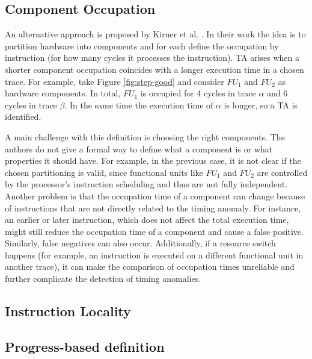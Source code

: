 \subsection{Component Occupation}

An alternative approach is proposed by Kirner et al. \cite{kirner_precise_2009}. In their work the idea is to partition hardware into components and for each define the occupation by instruction (for how many cycles it processes the instruction). TA arises when a shorter component occupation coincides with a longer execution time in a chosen trace. For example, take Figure \ref{fig:step-good} and consider $FU_1$ and $FU_2$ as hardware components. In total, $FU_1$ is occupied for 4 cycles in trace $\alpha$ and 6 cycles in trace $\beta$. In the same time the execution time of $\alpha$ is longer, so a TA is identified.

A main challenge with this definition is choosing the right components. The authors do not give a formal way to define what a component is or what properties it should have. For example, in the previous case, it is not clear if the chosen partitioning is valid, since functional units like $FU_1$ and $FU_2$ are controlled by the processor's instruction scheduling and thus are not fully independent. Another problem is that the occupation time of a component can change because of instructions that are not directly related to the timing anomaly. For instance, an earlier or later instruction, which does not affect the total execution time, might still reduce the occupation time of a component and cause a false positive. Similarly, false negatives can also occur. Additionally, if a resource switch happens (for example, an instruction is executed on a different functional unit in another trace), it can make the comparison of occupation times unreliable and further complicate the detection of timing anomalies.


\subsection{Instruction Locality}


\subsection{Progress-based definition}


